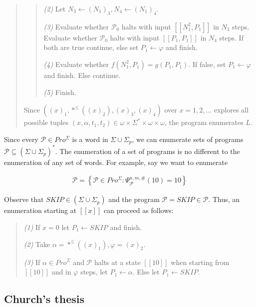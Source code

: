 \documentclass[a4paper, 12pt]{article}
\begin{document}
\begin{quote}
\begin{quote}
    \textit{(2)} Let $N_3 \leftarrow (N_1)_3, N_4 \leftarrow (N_1)_4$.

    \textit{(3)} Evaluate whether $\mathcal{P}_0$ halts with input $[\![ N_1^2,
    P_1]\!]$ in $N_3$ steps. Evaluate whether $\mathcal{P}_0$ halts with input
    $[\![ P_1, P_1 ]\!]$ in $N_4$ steps. If both are true continue, else
    set $P_1 \leftarrow \varphi$ and finish.

    \textit{(4)} Evaluate whether $f( N_1^2 , P_1 ) = g(P_1, P_1)$. If false,
    set $P_1 \leftarrow \varphi$ and finish. Else continue. 

    \textit{(5)} Finish.
\end{quote}

Since $\left( (x)_1, *^{\leq} \left( (x)_2 \right), (x)_3, (x)_4  \right) $ over
$x = 1, 2, \ldots$ explores all possible tuples $(x, \alpha, t_1, t_2) \in
\omega \times \Sigma^{*} \times \omega \times \omega$, the program enumerates
$L$.

\end{quote}
\normalsize

Since every $\mathcal{P} \in Pro^{\Sigma}$ is a word in $\Sigma \cup \Sigma_p$,
we can enumerate sets of programs $\mathscr{P} \subseteq (\Sigma \cup
\Sigma_p)^{*}$. The enumeration of a set of programs is no different to the
enumeration of any set of words. For example, say we want to enumerate 

\begin{align*}
    \mathscr{P} = \left\{ \mathcal{P} \in Pro^{\Sigma} : \Psi_{\mathcal{P}}^{n,
    m, \#}(10) = 10 \right\} 
\end{align*}

Observe that $SKIP \in (\Sigma \cup \Sigma_p)$ and the program $\mathcal{P} =
SKIP \in \mathscr{P}$. Thus, an enumeration starting at $[\![ x ]\!]$ can
proceed as follows:

\begin{quote}
    \textit{(1)} If $x = 0$ let $P_1 \leftarrow SKIP$ and finish. 

    \textit{(2)} Take $\alpha = *^{\leq} \left( (x)_1 \right), \varphi = (x)_2 $.  

    \textit{(3)} If $\alpha \in Pro^{\Sigma}$ and $\mathcal{P}$ halts at a state
    $[\![ 10 ]\!]$ when starting from $[\![ 10 ]\!]$ and in $\varphi$ steps,
    let $P_1 \leftarrow \alpha$. Else let $P_1 \leftarrow  SKIP$.
\end{quote}

\subsection{Church's thesis}
\end{document}

